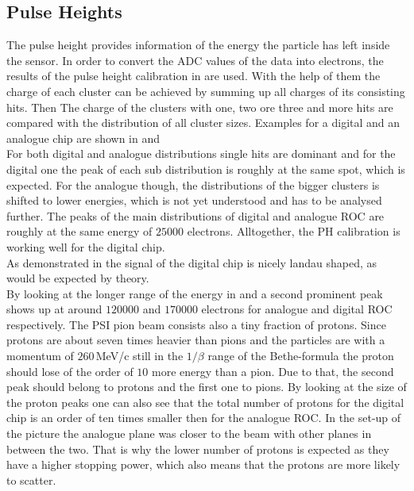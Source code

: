 \documentclass[british,11pt,a4paper]{memoir}
\begin{document}
\subsection{Pulse Heights}
The pulse height provides information of the energy the particle has left inside the sensor. In order to convert the \ac{ADC} values of the data into electrons, the results of the pulse height calibration in  are used. With the help of them the charge of each cluster can be achieved by summing up all charges of its consisting hits. Then The charge of the clusters with one, two ore three and more hits are compared with the distribution of all cluster sizes. Examples for a digital and an analogue chip are shown in  and \\
For both digital and analogue distributions single hits are dominant and for the digital one the peak of each sub distribution is roughly at the same spot, which is expected. For the analogue though, the distributions of the bigger clusters is shifted to lower energies, which is not yet understood and has to be analysed further. The peaks of the main distributions of digital and analogue \ac{ROC} are roughly at the same energy of $25000$ electrons. Alltogether, the \ac{PH} calibration is working well for the digital chip.\\
As demonstrated in  the signal of the digital chip is nicely landau shaped, as would be expected by theory.\\
By looking at the longer range of the energy in  and  a second prominent peak shows up at around $120000$ and $170000$ electrons for analogue and digital \ac{ROC} respectively. The \ac{PSI} pion beam consists also a tiny fraction of protons. Since protons are about seven times heavier than pions and the particles are with a momentum of $260\,$MeV/c still in the $1/\beta$ range of the Bethe-formula  the proton should lose of the order of $10$ more energy than a pion. Due to that, the second peak should belong to protons and the first one to pions. By looking at the size of the proton peaks one can also see that the total number of protons for the digital chip is an order of ten times smaller then for the analogue \ac{ROC}. In the set-up of the picture the analogue plane was closer to the beam with other planes in between the two. That is why the lower number of protons is expected as they have a higher stopping power, which also means that the protons are more likely to scatter. 
\newpage
\end{document}
